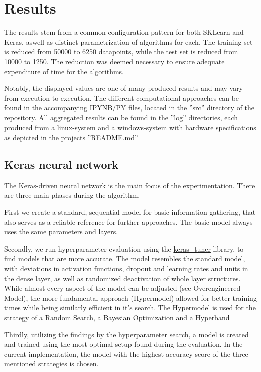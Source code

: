 \chapter{Results}
The results stem from a common configuration pattern for both SKLearn and Keras, aswell as distinct parametrization of algorithms for each.
The training set is reduced from 50000 to 6250 datapoints, while the test set is reduced from 10000 to 1250. The reduction was deemed necessary to ensure
adequate expenditure of time for the algorithms. 

Notably, the displayed values are one of many produced results and may vary from execution to execution.
The different computational approaches can be found in the accompanying IPYNB/PY files, located in the ''src'' directory of the repository.
All aggregated results can be found in the ''log'' directories, each produced from a linux-system and a windows-system with hardware specifications as depicted
in the projects ''README.md''

\section{Keras neural network}
The Keras-driven neural network is the main focus of the experimentation. There are three main phases during the algorithm.

First we create a standard, sequential model for basic information gathering, that also serves as a 
reliable reference for further approaches. The basic model always uses the same parameters and layers.

Secondly, we run hyperparameter evaluation using the \href{https://keras.io/keras_tuner/}{keras\_tuner} library, to find models that are 
more accurate. The model resembles the standard model, with deviations in activation functions, dropout and learning rates and units in the dense layer, as well as randomized deactivation of whole layer structures.
While almost every aspect of the model can be adjusted (see Overengineered Model), the more fundamental approach (Hypermodel) allowed for better training times while being similarly efficient in it's search.
The Hypermodel is used for the strategy of a Random Search, a Bayesian Optimization and a \href{https://arxiv.org/abs/1603.06560}{Hyperband}

Thirdly, utilizing the findings by the hyperparameter search, a model is created and trained using the most optimal setup found during the evaluation.
In the current implementation, the model with the highest accuracy score of the three mentioned strategies is chosen.

